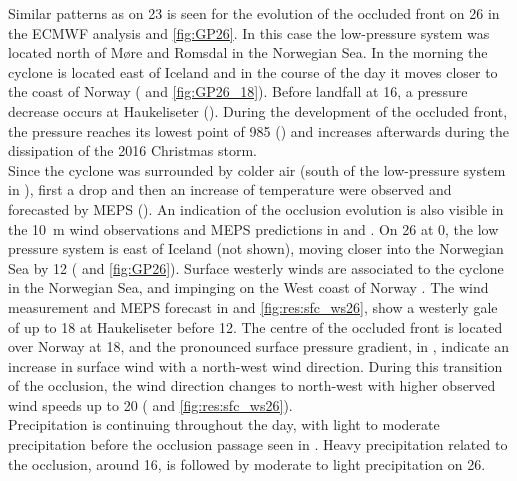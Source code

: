 Similar patterns as on \SI{23}{\dec} is seen for the evolution of the occluded front on \SI{26}{\dec} in the ECMWF analysis  and \ref{fig:GP26}. In this case the low-pressure system was located north of Møre and Romsdal in the Norwegian Sea. In the morning the cyclone is located east of Iceland and in the course of the day it moves closer to the coast of Norway ( and \ref{fig:GP26_18}). Before landfall at \SI{16}{\UTC}, a pressure decrease occurs at Haukeliseter (). During the development of the occluded front, the pressure reaches its lowest point of \SI{985}{\hPa} () and increases afterwards during the dissipation of the 2016 Christmas storm. 
\\
Since the cyclone was surrounded by colder air (south of the low-pressure system in ), first a drop and then an increase of temperature were observed and forecasted by MEPS (). An indication of the occlusion evolution is also visible in the \SI{10}{\metre} wind observations and MEPS predictions in  and . 
On \SI{26}{\dec} at \SI{0}{\UTC}, the low pressure system is east of Iceland (not shown), moving closer into the Norwegian Sea by \SI{12}{\UTC} ( and \ref{fig:GP26}). 
Surface westerly winds are associated to the cyclone in the Norwegian Sea, and impinging on the West coast of Norway . The wind measurement and MEPS forecast in  and \ref{fig:res:sfc_ws26}, show a westerly gale of up to \SI{18}{\mPs} at Haukeliseter before \SI{12}{\UTC}.
The centre of the occluded front is located over Norway at \SI{18}{\UTC}, and the pronounced surface pressure gradient, in , indicate an increase in surface wind with a north-west wind direction. During this transition of the occlusion, the wind direction changes to north-west with higher observed wind speeds up to \SI{20}{\mPs} ( and \ref{fig:res:sfc_ws26}). 
\\
Precipitation is continuing throughout the day, with light to moderate precipitation before the occlusion passage seen in . Heavy precipitation related to the occlusion, around \SI{16}{\UTC}, is followed by moderate to light precipitation on \SI{26}{\dec}. 
